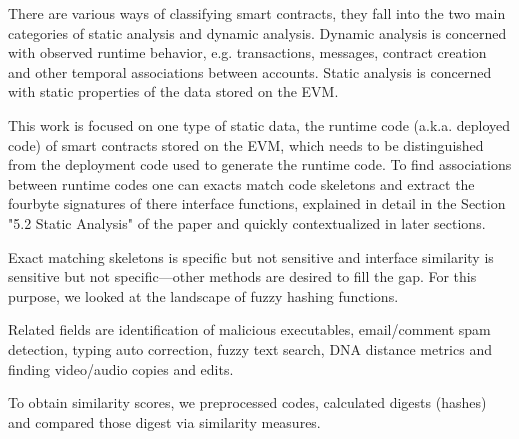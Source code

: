 \documentclass[../main.tex]{subfiles}
\begin{document}
There are various ways of classifying smart contracts, they fall into the two main categories of
static analysis and dynamic analysis.
Dynamic analysis is concerned with observed runtime behavior, e.g. transactions, messages, contract creation and other temporal associations between accounts.
Static analysis is concerned with static properties of the data stored on the EVM.

This work is focused on one type of static data, the runtime code (a.k.a. deployed code) of smart contracts stored on the EVM, which needs to be distinguished from the deployment code used to generate the runtime code.
To find associations between runtime codes one can exacts match code skeletons  and extract the fourbyte signatures  of there interface functions, explained in detail in the Section "5.2 Static Analysis" of the paper  and quickly contextualized in later sections.

Exact matching skeletons is specific but not sensitive and interface similarity is sensitive but not specific---other methods are desired to fill the gap. For this purpose, we looked at the landscape of fuzzy hashing functions.

Related fields are identification of malicious executables, email/comment spam detection, typing auto correction, fuzzy text search, DNA distance metrics and finding video/audio copies and edits.

To obtain similarity scores, we preprocessed codes, calculated digests (hashes) and compared those digest via similarity measures.

\end{document}
